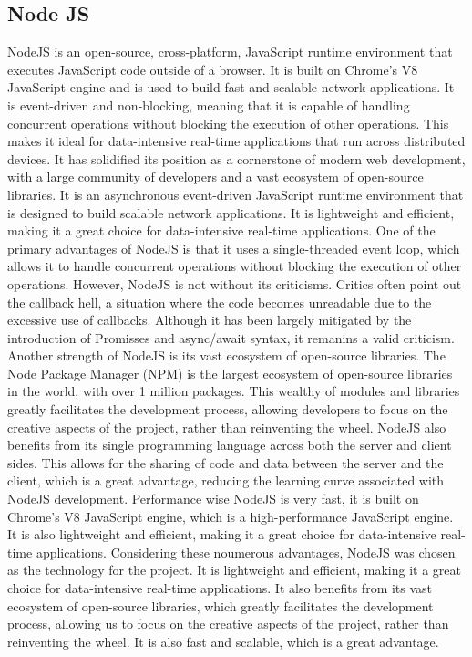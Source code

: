 \subsection{Node JS}
NodeJS is an open-source, cross-platform, JavaScript runtime environment that executes JavaScript code outside of a browser. It is built on Chrome's V8 JavaScript engine and is used to build fast and scalable network applications. It is event-driven and non-blocking, meaning that it is capable of handling concurrent operations without blocking the execution of other operations. This makes it ideal for data-intensive real-time applications that run across distributed devices.\cite{nodejs}
It has solidified its position as a cornerstone of modern web development, with a large community of developers and a vast ecosystem of open-source libraries. 
It is an asynchronous event-driven JavaScript runtime environment that is designed to build scalable network applications. It is lightweight and efficient, making it a great choice for data-intensive real-time applications.\cite{tilkov}
One of the primary advantages of NodeJS is that it uses a single-threaded event loop, which allows it to handle concurrent operations without blocking the execution of other operations. 
However, NodeJS is not without its criticisms. Critics often point out the callback hell, a situation where the code becomes unreadable due to the excessive use of callbacks. Although it has been largely mitigated by the introduction of Promisses and async/await syntax, it remanins a valid criticism. \cite{cantelon2014node}
Another strength of NodeJS is its vast ecosystem of open-source libraries. The Node Package Manager (NPM) is the largest ecosystem of open-source libraries in the world, with over 1 million packages. \cite{npm} This
wealthy of modules and libraries greatly facilitates the development process, allowing developers to focus on the creative aspects of the project, rather than reinventing the wheel.
NodeJS also benefits from its single programming language across both the server and client sides. This allows for the sharing of code and data between the server and the client, which is a great advantage, reducing the learning curve associated with NodeJS development. \cite{tilkov}
Performance wise NodeJS is very fast, it is built on Chrome's V8 JavaScript engine, which is a high-performance JavaScript engine. It is also lightweight and efficient, making it a great choice for data-intensive real-time applications. \cite{tilkov}
Considering these noumerous advantages, NodeJS was chosen as the technology for the project. It is lightweight and efficient, making it a great choice for data-intensive real-time applications. It also benefits from its vast ecosystem of open-source libraries, which greatly facilitates the development process, allowing us to focus on the creative aspects of the project, rather than reinventing the wheel. It is also fast and scalable, which is a great advantage.


